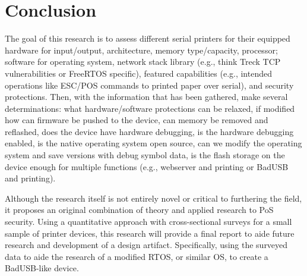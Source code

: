 \chapter{\leavevmode Conclusion}
\label{chap:conclusion}

The goal of this research is to assess different serial printers for their equipped hardware for input/output, architecture, memory type/capacity, processor; software for operating system, network stack library (e.g., think Treck TCP vulnerabilities or FreeRTOS specific), featured capabilities (e.g., intended operations like ESC/POS commands to printed paper over serial), and security protections. Then, with the information that has been gathered, make several determinations: what hardware/software protections can be relaxed, if modified how can firmware be pushed to the device, can memory be removed and reflashed, does the device have hardware debugging, is the hardware debugging enabled, is the native operating system open source, can we modify the operating system and save versions with debug symbol data, is the flash storage on the device enough for multiple functions (e.g., webserver and printing or BadUSB and printing).

Although the research itself is not entirely novel or critical to furthering the field, it proposes an original combination of theory and applied research to PoS security. Using a quantitative approach with cross-sectional surveys for a small sample of printer devices, this research will provide a final report to aide future research and development of a design artifact. Specifically, using the surveyed data to aide the research of a modified RTOS, or similar OS, to create a BadUSB-like device.